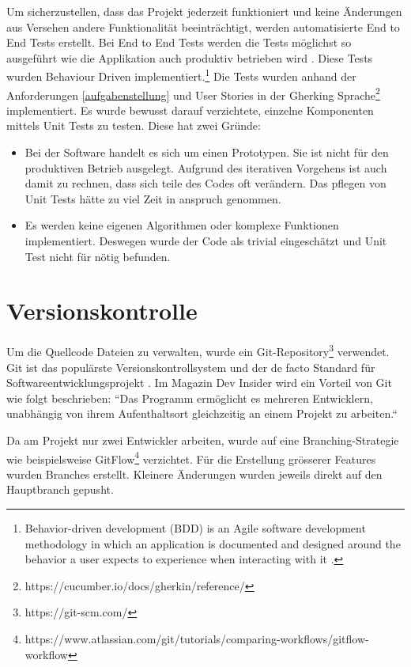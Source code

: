 Um sicherzustellen, dass das Projekt jederzeit funktioniert und keine Änderungen
aus Versehen andere Funktionalität beeinträchtigt, werden automatisierte
End to End Tests erstellt. Bei End to End Tests werden die Tests möglichst
so ausgeführt wie die Applikation auch produktiv betrieben wird \parencite{georgian_2021}.
Diese Tests wurden Behaviour Driven implementiert.\footnote{
    Behavior-driven development (BDD) is an Agile software development methodology
    in which an application is documented and designed around the behavior a user
    expects to experience when interacting with it \parencite{what_is_bdd}.
}  Die Tests wurden anhand der Anforderungen \ref{aufgabenstellung}
und User Stories in der Gherking Sprache\footnote{https://cucumber.io/docs/gherkin/reference/} implementiert.
Es wurde bewusst darauf verzichtete, einzelne Komponenten mittels Unit Tests zu testen.
Diese hat zwei Gründe:
\begin{itemize}
    \item Bei der Software handelt es sich um einen Prototypen.
          Sie ist nicht für den produktiven Betrieb ausgelegt.
          Aufgrund des iterativen Vorgehens ist auch damit zu rechnen, dass sich teile des Codes oft verändern.
          Das pflegen von Unit Tests hätte zu viel Zeit in anspruch genommen.
    \item Es werden keine eigenen Algorithmen oder komplexe Funktionen implementiert.
          Deswegen wurde der Code als trivial eingeschätzt und Unit Test nicht für nötig befunden.
\end{itemize}



\section{Versionskontrolle}

Um die Quellcode Dateien zu verwalten, wurde ein Git-Repository\footnote{https://git-scm.com/} verwendet.
Git ist das populärste Versionskontrollsystem und der de facto Standard für Softwareentwicklungsprojekt \parencite{git}.
Im Magazin Dev Insider  wird ein Vorteil von Git wie folgt beschrieben:
``Das Programm ermöglicht es mehreren Entwicklern, unabhängig von ihrem Aufenthaltsort gleichzeitig an einem Projekt zu arbeiten.`` \cite{was_ist_git}

Da am Projekt nur zwei Entwickler arbeiten,
wurde auf eine Branching-Strategie wie beispielsweise
GitFlow\footnote{https://www.atlassian.com/git/tutorials/comparing-workflows/gitflow-workflow} verzichtet.
Für die Erstellung grösserer Features wurden Branches erstellt.
Kleinere Änderungen wurden jeweils direkt auf den Hauptbranch gepusht.

